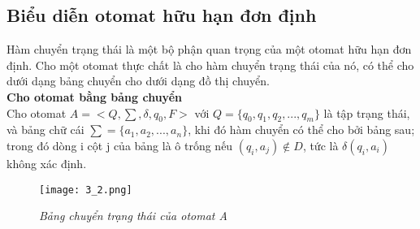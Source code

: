 \begin{flushleft}
\subsection{Biểu diễn otomat hữu hạn đơn định}
\hspace{10mm}Hàm chuyển trạng thái là một bộ phận quan trọng của một otomat hữu hạn đơn định. Cho một otomat thực chất là cho hàm chuyển trạng thái của nó, có thể cho dưới dạng bảng chuyển cho dưới dạng đồ thị chuyển.\\
\textbf{Cho otomat bằng bảng chuyển}\\
Cho otomat $A = <Q, \sum, \delta, q_0, F>$ với $Q = \{ q_0, q_1, q_2,...,q_m \}$ là tập trạng thái, và bảng chữ
cái $\sum = \{ a_1, a_2,...,a_n \}$, khi đó hàm chuyển có thể cho bởi bảng sau; trong đó dòng i cột j của
bảng là ô trống nếu $(q_i, a_j) \not \in D$, tức là $\delta(q_i, a_i)$ không xác định. 
\begin{figure}[ht]
\texttt{[image: 3\_2.png]}
\caption{ \textit{Bảng chuyển trạng thái của otomat A} }
\end{figure}
\end{flushleft}

